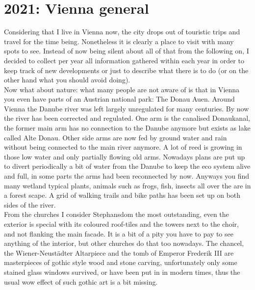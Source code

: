 \section{2021: Vienna general}
\label{2021Vienna}

Considering that I live in Vienna now, the city drops out of touristic trips and travel for the time being. Nonetheless it is clearly a place to visit with many spots to see. Instead of now being silent about all of that from the following on, I decided to collect per year all information gathered within each year in order to keep track of new developments or just to describe what there is to do (or on the other hand what you should avoid doing).\\

Now what about nature: what many people are not aware of is that in Vienna you even have parts of an Austrian national park: The Donau Auen. Around Vienna the Danube river was left largely unregulated for many centuries. By now the river has been corrected and regulated. One arm is the canalised Donaukanal, the former main arm has no connection to the Danube anymore but exists as lake called Alte Donau. Other side arms are now fed by ground water and rain without being connected to the main river anymore. A lot of reed is growing in those low water and only partially flowing old arms. Nowadays plans are put up to divert periodically a bit of water from the Danube to keep the eco system alive and full, in some parts the arms had been reconnected by now. Anyways you find many wetland typical plants, animals such as frogs, fish, insects all over the are in a forest scape. A grid of walking trails and bike paths has been set up on both sides of the river.\\
From the churches I consider Stephansdom the most outstanding, even the exterior is special with its coloured roof-tiles and the towers next to the choir, and not flanking the main facade. It is a bit of a pity you have to pay to see anything of the interior, but other churches do that too nowadays. The chancel, the Wiener-Neust\"adter Altarpiece and the tomb of Emperor Frederik III are masterpieces of gothic style wood and stone carving, unfortunately only some stained glass windows survived, or have been put in in modern times, thus the usual wow effect of such gothic art is a bit missing. \\
